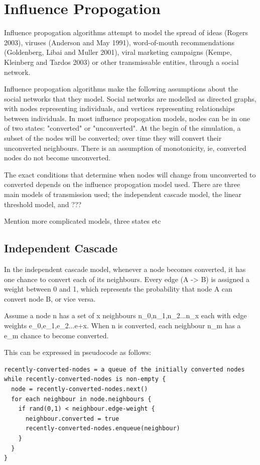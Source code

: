 \section{Influence Propogation}

 Influence propogation algorithms attempt to model the spread of ideas (Rogers 2003), viruses (Anderson and May 1991), word-of-mouth recommendations (Goldenberg, Libai and Muller 2001), viral marketing campaigns (Kempe, Kleinberg and Tardos 2003) or other transmissable entities, through a social network.

Influence propogation algorithms make the following assumptions about the social networks that they model. Social networks are modelled as directed graphs, with nodes representing individuals, and vertices representing relationships between individuals. In most influence propogation models, nodes can be in one of two states: "converted" or "unconverted". At the begin of the simulation, a subset of the nodes will be converted; over time they will convert their unconverted neighbours. There is an assumption of monotonicity, ie, converted nodes do not become unconverted.

 The exact conditions that determine when nodes will change from unconverted to converted depends on the influence propogation model used. There are three main models of transmission used; the independent cascade model, the linear threshold model, and ???

Mention more complicated models, three states etc

\subsection{Independent Cascade}
 In the independent cascade model, whenever a node becomes converted, it has one chance to convert each of its neighbours. Every edge (A -> B) is assigned a weight between 0 and 1, which represents the probability that node A can convert node B, or vice versa.

Assume a node n has a set of x neighbours n\_0,n\_1,n\_2...n\_x each with edge weights e\_0,e\_1,e\_2...e+x. When n is converted, each neighbour n\_m has a e\_m chance to become converted.

This can be expressed in pseudocode as follows:

\begin{verbatim}
recently-converted-nodes = a queue of the initially converted nodes
while recently-converted-nodes is non-empty {
  node = recently-converted-nodes.next()
  for each neighbour in node.neighbours {
    if rand(0,1) < neighbour.edge-weight {
      neighbour.converted = true
      recently-converted-nodes.enqueue(neighbour)
    }
  }
}
\end{verbatim}


